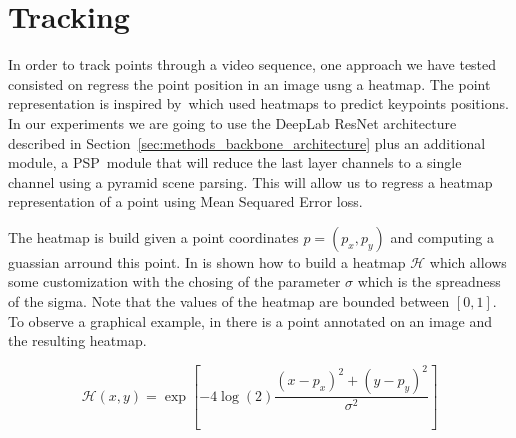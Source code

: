 \section{Tracking}
\label{sec:methods_tracking}

In order to track points through a video sequence, one approach we have tested consisted on regress the point position in an image usng a heatmap.
The point representation is inspired by~\hourglass which used heatmaps to predict keypoints positions.
In our experiments we are going to use the DeepLab ResNet architecture described in Section~\ref{sec:methods_backbone_architecture} plus an additional module, a PSP~\pspnet module that will reduce the last layer channels to a single channel using a pyramid scene parsing.
This will allow us to regress a heatmap representation of a point using Mean Sequared Error loss.

The heatmap is build given a point coordinates $p = (p_x, p_y)$ and computing a guassian arround this point.
In  is shown how to build a heatmap $\mathcal{H}$ which allows some customization with the chosing of the parameter $\sigma$ which is the spreadness of the sigma.
Note that the values of the heatmap are bounded between $[0, 1]$.
To observe a graphical example, in  there is a point annotated on an image and the resulting heatmap.

\begin{equation}
  \mathcal{H}(x, y) = \exp \left[ -4 \log(2) \frac{ (x - p_x)^2 + (y - p_y)^2 }{ \sigma^2 } \right]
  \label{eq:heatmap}
\end{equation}

